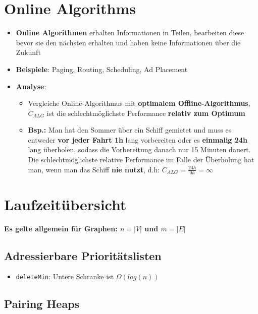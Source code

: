\documentclass[10pt,a4paper]{article}
\begin{document}
	\section{Online Algorithms}
	\label{oa:sec:online_algorithms}

	\begin{itemize}
		\item \textbf{Online Algorithmen} erhalten Informationen in Teilen, bearbeiten diese bevor sie den nächsten erhalten und haben keine Informationen über die Zukunft
		\item \textbf{Beispiele}: Paging, Routing, Scheduling, Ad Placement
		\item \textbf{Analyse}:
		\begin{itemize}
			\item Vergleiche Online-Algorithmus mit \textbf{optimalem Offline-Algorithmus}, $C_{ALG}$ ist die schlechtmöglichste Performance \textbf{relativ zum Optimum}
			\item \textbf{Bsp.:} Man hat den Sommer über ein Schiff gemietet und muss es entweder \textbf{vor jeder Fahrt 1h} lang vorbereiten oder es \textbf{einmalig 24h} lang überholen, sodass die Vorbereitung danach nur 15 Minuten dauert. Die schlechtmöglichste relative Performance im Falle der Überholung hat man, wenn man das Schiff \textbf{nie nutzt}, d.h: $C_{ALG} = \frac{24h}{0h} = \infty$
		\end{itemize}
	\end{itemize}

	\newpage
	\section{Laufzeitübersicht}
	\label{lz:sec:laufzeituebersicht}
	\textbf{Es gelte allgemein für Graphen: $n = |V|$ und $m = |E|$}
	\subsection{Adressierbare Prioritätslisten}
	\label{lz:sub:adressierbare_prioritaetslisten}
	
	\begin{itemize}
		\item \texttt{deleteMin}: Untere Schranke ist $\Omega(log (n))$
	\end{itemize}

	\subsection{Pairing Heaps}
	\label{lz:sub:pairing_heaps}
	
\end{document}
